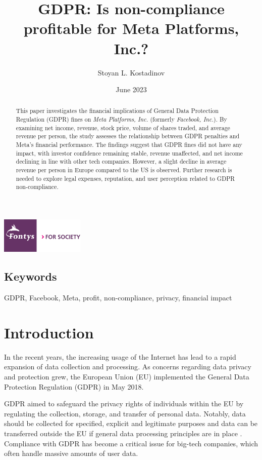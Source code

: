 \documentclass[12pt, a4paper]{article}
\title{GDPR: Is non-compliance profitable for Meta Platforms, Inc.?}
\author{Stoyan L. Kostadinov}
\date{June 2023}
\begin{document}
\maketitle

\begin{center}
    \includegraphics[width=0.3\textwidth]{fontys-logo}
\end{center}

\begin{abstract}
    This paper investigates the financial implications of General Data
    Protection Regulation (GDPR) fines on \textit{Meta Platforms, Inc.}
    (formerly \textit{Facebook, Inc.}). By examining net income, revenue, stock
    price, volume of shares traded, and average revenue per person, the study
    assesses the relationship between GDPR penalties and Meta's financial
    performance. The findings suggest that GDPR fines did not have any impact,
    with investor confidence remaining stable, revenue unaffected, and net
    income declining in line with other tech companies. However, a slight
    decline in average revenue per person in Europe compared to the US is
    observed. Further research is needed to explore legal expenses, reputation,
    and user perception related to GDPR non-compliance.
\end{abstract}

\subsection*{Keywords}

GDPR, Facebook, Meta, profit, non-compliance, privacy, financial impact

\section*{Introduction}

In the recent years, the increasing usage of the Internet has lead to a rapid
expansion of data collection and processing\cite{khan2014big}. As concerns
regarding data privacy and protection grew, the European Union (EU) implemented
the General Data Protection Regulation (GDPR) in May
2018\cite{greengard2018weighing, historyGdpr}.

GDPR aimed to safeguard the privacy rights of individuals within the EU by
regulating the collection, storage, and transfer of personal
data\cite{historyGdpr}. Notably, data should be collected for specified,
explicit and legitimate purposes\cite{europeanParliamentGdprArticle5} and data
can be transferred outside the EU if general data processing principles are in
place \cite{europeanParliamentGdprArticle44}. Compliance with GDPR has become a
critical issue for big-tech companies, which often handle massive amounts of
user data.
\end{document}
